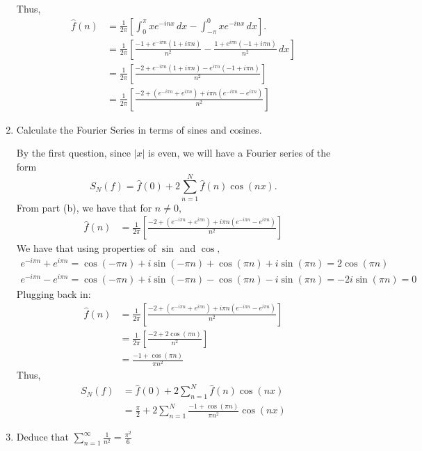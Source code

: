 \documentclass[11pt]{article}
\begin{document}
\begin{problem}
\begin{enumerate}
\begin{solution}
Thus, 
\begin{align*}
    \hat{f}(n) &= \frac{1}{2\pi}\left[\int_0^\pi x e^{-inx}\,dx - \int_{-\pi}^0 x e^{-inx}\, dx\right].\\
    &= \frac{1}{2\pi}\left[\frac{-1 + e^{-i\pi n}(1 + i\pi n)}{n^2} - \frac{1 + e^{i\pi n}(-1 + i\pi n)}{n^2}\, dx\right]\\
    &= \frac{1}{2\pi}\left[\frac{-2 + e^{-i\pi n}(1 + i\pi n) - e^{i\pi n}(-1 + i\pi n)}{n^2}\right]\\
    &= \frac{1}{2\pi}\left[\frac{-2 + (e^{-i\pi n} + e^{ i\pi n}) + i\pi n(e^{-i\pi n} - e^{i\pi n})}{n^2}\right]
\end{align*}
        \end{solution}
\item Calculate the Fourier Series in terms of sines and cosines.
\begin{solution}
    By the first question, since $|x|$ is even, we will have a Fourier series of the form 
    \[S_N(f) = \hat{f}(0) + 2\sum_{n=1}^N \hat{f}(n)\cos(nx).\] From part (b), we have that for $n \neq 0,$
    \begin{align*}
        \hat{f}(n) &= \frac{1}{2\pi}\left[\frac{-2 + (e^{-i\pi n} + e^{ i\pi n}) + i\pi n(e^{-i\pi n} - e^{i\pi n})}{n^2}\right]
    \end{align*}
    We have that using properties of $\sin$ and $\cos,$ 
    \begin{align*}
       e^{-i\pi n} + e^{ i\pi n} = \cos(-\pi n) + i\sin(-\pi n) +  \cos(\pi n) + i\sin(\pi n) = 2\cos(\pi n) 
    \end{align*}
    \begin{align*}
        e^{-i\pi n} - e^{ i\pi n} = \cos(-\pi n) + i\sin(-\pi n) - \cos(\pi n) - i\sin(\pi n) = -2i\sin(\pi n) = 0
    \end{align*}
    Plugging back in:
        \begin{align*}
        \hat{f}(n) &= \frac{1}{2\pi}\left[\frac{-2 + (e^{-i\pi n} + e^{ i\pi n}) + i\pi n(e^{-i\pi n} - e^{i\pi n})}{n^2}\right]\\
        \ &= \frac{1}{2\pi}\left[\frac{-2 + 2\cos(\pi n)}{n^2}\right]\\
        &= \frac{-1 + \cos(\pi n)}{\pi n^2}
    \end{align*}
    Thus, 
\begin{align*}
    S_N(f) &= \hat{f}(0) + 2\sum_{n=1}^N \hat{f}(n)\cos(nx)\\
    &= \frac{\pi}{2} + 2\sum_{n=1}^N\frac{-1 + \cos(\pi n)}{\pi n^2} \cos(nx)
\end{align*}
\end{solution}
\item 
Deduce that $\sum_{n=1}^\infty \frac{1}{n^2} = \frac{\pi^2}{6}$
   \begin{solution}
       \begin{lemma}


\end{lemma}
\end{solution}
\end{enumerate}
\end{problem}
\end{document}

